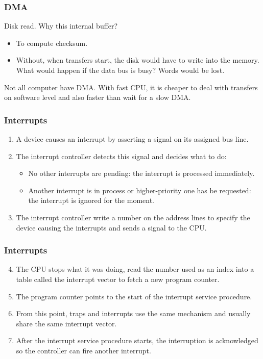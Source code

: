 \begin{frame}
  \frametitle{DMA}
  \begin{block}{Disk read. Why this internal buffer?}
    \begin{itemize}
      \item To compute checksum.
      \item Without, when transfers start, the disk would have to write into the memory. What would happen if the data bus is busy? Words would be lost.
    \end{itemize}
  \end{block}
  Not all computer have DMA. With fast CPU, it is cheaper to deal with transfers on software level and also faster than wait for a slow DMA.
\end{frame}

\begin{frame}
  \frametitle{Interrupts}
  \begin{enumerate}
    \item A device causes an interrupt by asserting a signal on its assigned bus line.
    \item The interrupt controller detects this signal and decides what to do:
    \begin{itemize}
      \item No other interrupts are pending: the interrupt is processed immediately.
      \item Another interrupt is in process or higher-priority one has be requested: the interrupt is ignored for the moment.
    \end{itemize}
      \item The interrupt controller write a number on the address lines to specify the device causing the interrupts and sends a signal to the CPU.
  \end{enumerate}
\end{frame}

\begin{frame}
  \frametitle{Interrupts}
  \begin{enumerate}\setcounter{enumi}{3}
    \item The CPU stops what it was doing, read the number used as an index into a table called the interrupt vector to fetch a new program counter.
    \item The program counter points to the start of the interrupt service procedure.
    \item From this point, traps and interrupts use the same mechanism and usually share the same interrupt vector.
    \item After the interrupt service procedure starts, the interruption is acknowledged so the controller can fire another interrupt.
  \end{enumerate}
\end{frame}

